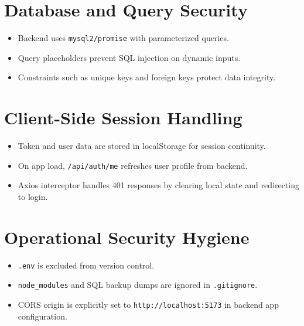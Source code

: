 \section{Database and Query Security}
\begin{itemize}[leftmargin=1.3cm]
\item Backend uses \texttt{mysql2/promise} with parameterized queries.
\item Query placeholders prevent SQL injection on dynamic inputs.
\item Constraints such as unique keys and foreign keys protect data integrity.
\end{itemize}

\section{Client-Side Session Handling}
\begin{itemize}[leftmargin=1.3cm]
\item Token and user data are stored in localStorage for session continuity.
\item On app load, \texttt{/api/auth/me} refreshes user profile from backend.
\item Axios interceptor handles 401 responses by clearing local state and redirecting to login.
\end{itemize}

\section{Operational Security Hygiene}
\begin{itemize}[leftmargin=1.3cm]
\item \texttt{.env} is excluded from version control.
\item \texttt{node\_modules} and SQL backup dumps are ignored in \texttt{.gitignore}.
\item CORS origin is explicitly set to \texttt{http://localhost:5173} in backend app configuration.
\end{itemize}
